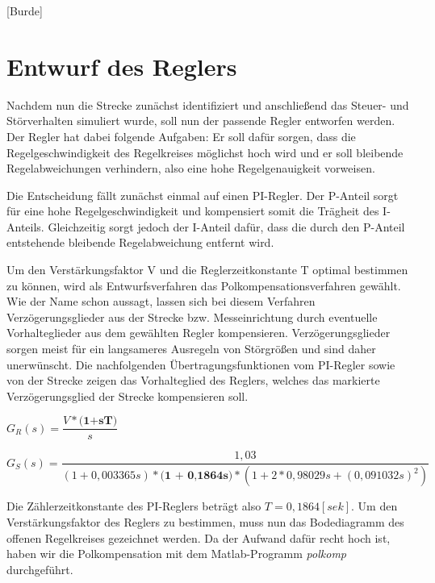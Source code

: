 
\newpage

[Burde]

\section{Entwurf des Reglers}

Nachdem nun die Strecke zunächst identifiziert und anschließend das Steuer- und Störverhalten simuliert wurde, soll nun der passende Regler entworfen werden. Der Regler hat dabei folgende Aufgaben: Er soll dafür sorgen, dass die Regelgeschwindigkeit des Regelkreises möglichst hoch wird und er soll bleibende Regelabweichungen verhindern, also eine hohe Regelgenauigkeit vorweisen.

Die Entscheidung fällt zunächst einmal auf einen PI-Regler. Der P-Anteil sorgt für eine hohe Regelgeschwindigkeit und kompensiert somit die Trägheit des I-Anteils. Gleichzeitig sorgt jedoch der I-Anteil dafür, dass die durch den P-Anteil entstehende bleibende Regelabweichung entfernt wird. 

Um den Verstärkungsfaktor V und die Reglerzeitkonstante T optimal bestimmen zu können, wird als Entwurfsverfahren das Polkompensationsverfahren gewählt. Wie der Name schon aussagt, lassen sich bei diesem Verfahren Verzögerungsglieder aus der Strecke bzw. Messeinrichtung durch eventuelle Vorhalteglieder aus dem gewählten Regler kompensieren. Verzögerungsglieder sorgen meist für ein langsameres Ausregeln von Störgrößen und sind daher unerwünscht. Die nachfolgenden Übertragungsfunktionen vom PI-Regler sowie von der Strecke zeigen das Vorhalteglied des Reglers, welches das markierte Verzögerungsglied der Strecke kompensieren soll. 

\begin{center}
$ G_{R}(s) = \dfrac{V*\textbf{(1+sT)}}{s} $
\end{center}

\begin{center}
$ G_{S}(s) = \dfrac{1,03}{(1 + 0,003365s) * \textbf{(1 + 0,1864s)} * (1 + 2*0,98029s + (0,091032s)^{2}) }$
\end{center}

Die Zählerzeitkonstante des PI-Reglers beträgt also $ T = 0,1864[sek] $. Um den Verstärkungsfaktor des Reglers zu bestimmen, muss nun das Bodediagramm des offenen Regelkreises gezeichnet werden. Da der Aufwand dafür recht hoch ist, haben wir die Polkompensation mit dem Matlab-Programm \textit{polkomp} durchgeführt.
